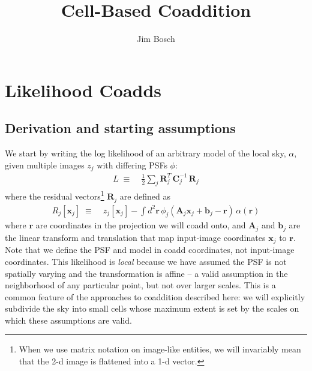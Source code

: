 \documentclass[DM,authoryear,toc]{lsstdoc}
\title{Cell-Based Coaddition}
\author{%
Jim Bosch
}
\date{\vcsDate}
\begin{document}
\maketitle

\section{Likelihood Coadds}

\subsection{Derivation and starting assumptions}

We start by writing the log likelihood of an arbitrary model of the local sky, $α$, given multiple images $z_j$ with differing PSFs $ϕ$:
\begin{align}
    L \; ≡ \; &
        \frac{1}{2}
        \sum_j
        \symbf{R}_j^T
        \, \symbf{C}_j^{-1}
        \, \symbf{R}_j
\end{align}
where the residual vectors\footnote{When we use matrix notation on image-like entities, we will invariably mean that the 2-d image is flattened into a 1-d vector.} $\symbf{R}_j$ are defined as
\begin{align}
    R_j[\symbf{x}_j] \; ≡ \; &
        z_j[\symbf{x}_j]
        - \int\!\!d^2\symbf{r}
            \, ϕ_j\!\left(\symbf{A}_j\symbf{x}_j + \symbf{b}_j - \symbf{r}\right)
            \, α(\symbf{r})
    \label{eqn:residual-definition}
\end{align}
where $\symbf{r}$ are coordinates in the projection we will coadd onto, and $\symbf{A}_j$ and $\symbf{b}_j$ are the linear transform and translation that map input-image coordinates $\symbf{x}_j$ to $\symbf{r}$.
Note that we define the PSF and model in coadd coordinates, not input-image coordinates.
This likelihood is \emph{local} because we have assumed the PSF is not spatially varying and the transformation is affine -- a valid assumption in the neighborhood of any particular point, but not over larger scales.
This is a common feature of the approaches to coaddition described here: we will explicitly subdivide the sky into small cells whose maximum extent is set by the scales on which these assumptions are valid.
\end{document}
